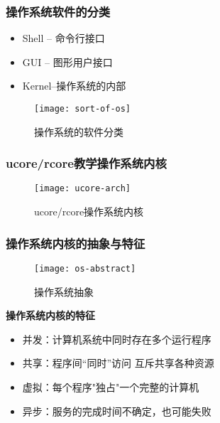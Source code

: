 %
%
%
%

\begin{frame}
	\frametitle{操作系统软件的分类}
		\begin{itemize}
		\item Shell -- 命令行接口
		\item GUI -- 图形用户接口
		\item Kernel--操作系统的内部
	\end{itemize}
	\begin{figure}
		\centering
		\texttt{[image: sort-of-os]}
		\caption{操作系统的软件分类}
	\end{figure}
\end{frame}

\begin{frame}
	\frametitle{ucore/rcore教学操作系统内核}
	\begin{figure}
		\centering
		\texttt{[image: ucore-arch]}
		\caption{ucore/rcore操作系统内核}
	\end{figure}
\end{frame}



\begin{frame}
	\frametitle{操作系统内核的抽象与特征}
	\begin{figure}
	\centering
	\texttt{[image: os-abstract]}
	\caption{操作系统抽象}
\end{figure}
	\textbf{操作系统内核的特征}
	\begin{itemize}
		\item 并发：计算机系统中同时存在多个运行程序
		\item 共享：程序间“同时”访问 互斥共享各种资源
		\item 虚拟：每个程序"独占"一个完整的计算机
		\item 异步：服务的完成时间不确定，也可能失败
	\end{itemize}

\end{frame}



